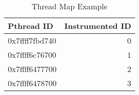 \vspace{3em}
\renewcommand{\arraystretch}{1.5}
\begin{table}
\caption{Thread Map Example}
\begin{center}
\begin{tabular}{| l | r |}
\hline
\textbf{Pthread ID} & \textbf{Instrumented ID} \\ \hline
0x7ffff7fbd740 & 0 \\ \hline
0x7ffff6c76700  & 1 \\ \hline
0x7ffff6477700 & 2 \\ \hline
0x7ffff6478700  & 3 \\
\hline
\end{tabular}
\end{center}
\end{table}
\vspace{3em}